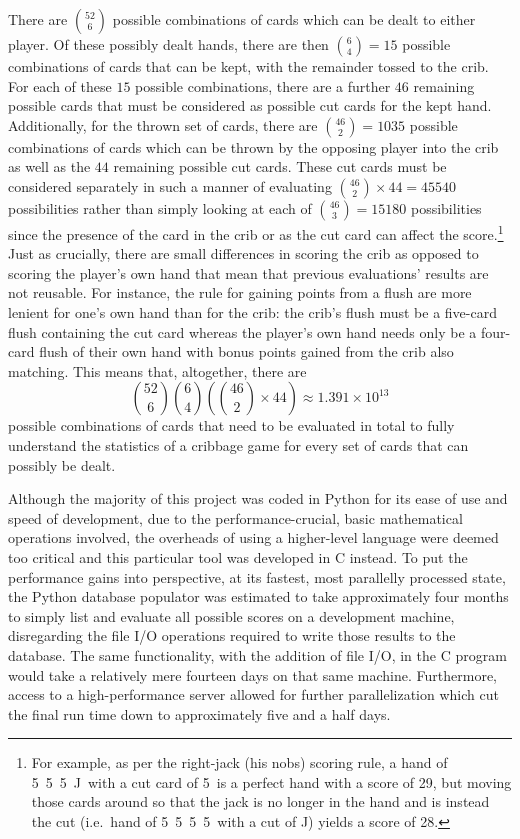 There are ${52 \choose 6}$ possible combinations of cards which can be dealt to
either player.
%
Of these possibly dealt hands, there are then ${6 \choose 4} = 15$ possible
combinations of cards that can be kept,
with the remainder tossed to the crib.
%
For each of these $15$ possible combinations,
there are a further $46$ remaining possible cards
that must be considered as possible cut cards for the kept hand.
%
Additionally, for the thrown set of cards,
there are ${46 \choose 2} = 1035$ possible combinations of cards which can be
thrown by the opposing player into the crib as well as the
$44$ remaining possible cut cards.
%
These cut cards must be considered separately in such a manner of
evaluating ${46 \choose 2} \times 44 = 45540$ possibilities rather than
simply looking at each of ${46 \choose 3} = 15180$ possibilities
since the presence of the card in the crib or as the cut card
can affect the score.\footnote{
	For example, as per the right-jack (his nobs) scoring rule,
	a hand of 5\clubs\ 5\hearts\ 5\spades\ J\diamonds\ 
	with a cut card of 5\diamonds\ is a perfect hand
	with a score of 29,
	but moving those cards around so that the jack is no longer in the hand
	and is instead the cut
	(i.e.\  hand of 5\clubs\ 5\hearts\ 5\spades\ 5\diamonds\
	with a cut of J\diamonds)
	yields a score of 28.
}
%
Just as crucially, there are small differences in scoring the crib as opposed to
scoring the player's own hand that mean that previous evaluations' results are
not reusable.
%
For instance, the rule for gaining points from a flush are more lenient for
one's own hand than for the crib:
the crib's flush must be a five-card flush containing the cut card
whereas the player's own hand needs only be a four-card flush of their own
hand with bonus points gained from the crib also matching.
%
This means that, altogether, there are 
\[
	{52 \choose 6}
	{6 \choose 4}
	\left(
			{46 \choose 2} \times 44
	\right)
	\approx
	1.391 \times {10}^{13}
\]
possible combinations of cards that need to be evaluated in total to fully 
understand the statistics
of a cribbage game for every set of cards that can possibly be dealt.

Although the majority of this project was coded in Python for its ease of use
and speed of development,
due to the performance-crucial, basic mathematical operations involved,
the overheads of using a higher-level language were deemed too critical and
this particular tool was developed in C instead.
%
To put the performance gains into perspective,
at its fastest, most parallelly processed state,
the Python database populator was estimated to take approximately four months to
simply list and evaluate all possible scores on a development machine,
disregarding the file I/O operations required to write those results to the
database.
%
The same functionality, with the addition of file I/O,
in the C program would take a relatively mere fourteen days
on that same machine.
%
Furthermore, access to a high-performance server allowed for further
parallelization which cut the final run time down to approximately
five and a half days.

